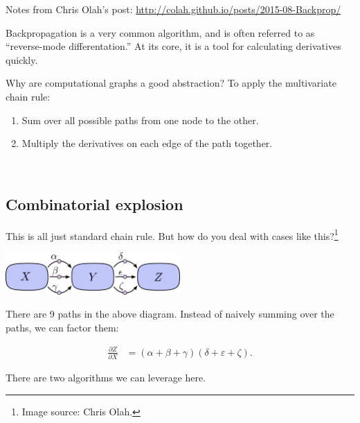 Notes from Chris Olah's post: \url{http://colah.github.io/posts/2015-08-Backprop/}

Backpropagation is a very common algorithm, and is often referred to as ``reverse-mode differentation.''  At its core, it is a tool for calculating derivatives quickly.

Why are computational graphs a good abstraction?  To apply the multivariate chain rule:

\begin{enumerate}
  \item Sum over all possible paths from one node to the other.
  \item Multiply the derivatives on each edge of the path together.
\end{enumerate}


 

\subsection{Combinatorial explosion}

This is all just standard chain rule.  But how do you deal with cases like this?\footnote{Image source: Chris Olah.}

\begin{center}
\includegraphics[width=0.5\textwidth]{img/chain-def-greek}
\end{center}

There are 9 paths in the above diagram.  Instead of naively summing over the paths, we can factor them:

\begin{align*}
  \frac{\partial Z}{\partial X} &= (\alpha + \beta + \gamma)(\delta + \varepsilon + \zeta).
\end{align*}

There are two algorithms we can leverage here.

